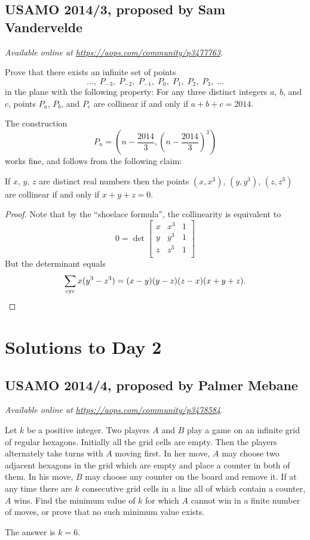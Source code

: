 \documentclass[11pt]{scrartcl}
\begin{document}
\subsection{USAMO 2014/3, proposed by Sam Vandervelde}
\textsl{Available online at \url{https://aops.com/community/p3477763}.}
\begin{mdframed}[style=mdpurplebox,frametitle={Problem statement}]
Prove that there exists an infinite set of points
\[ \dots, \; P_{-3}, \; P_{-2},\; P_{-1},\; P_0,\; P_1,\; P_2,\; P_3,\; \dots \]
in the plane with the following property:
For any three distinct integers $a$, $b$, and $c$,
points $P_a$, $P_b$, and $P_c$ are collinear if and only if $a+b+c=2014$.
\end{mdframed}
The construction
\[ P_n = \left( n-\frac{2014}{3},
  \left( n-\frac{2014}{3} \right)^3 \right) \]
works fine, and follows from the following claim:
\begin{claim*}
  If $x$, $y$, $z$ are distinct real numbers
  then the points $(x,x^3)$, $(y,y^3)$, $(z,z^3)$
  are collinear if and only if $x+y+z=0$.
\end{claim*}
\begin{proof}
  Note that by the ``shoelace formula'',
  the collinearity is equivalent to
  \[
    0 =
    \det \begin{bmatrix}
      x & x^3 & 1 \\
      y & y^3 & 1 \\
      z & z^3 & 1 \\
    \end{bmatrix}
  \]
  But the determinant equals
  \[ \sum_{\text{cyc}} x(y^3-z^3)
    = (x-y)(y-z)(z-x)(x+y+z). \qedhere  \]
\end{proof}
\pagebreak

\section{Solutions to Day 2}
\subsection{USAMO 2014/4, proposed by Palmer Mebane}
\textsl{Available online at \url{https://aops.com/community/p3478584}.}
\begin{mdframed}[style=mdpurplebox,frametitle={Problem statement}]
Let $k$ be a positive integer.
Two players $A$ and $B$ play a game on an infinite grid of regular hexagons.
Initially all the grid cells are empty.
Then the players alternately take turns with $A$ moving first.
In her move, $A$ may choose two adjacent hexagons in the grid
which are empty and place a counter in both of them.
In his move, $B$ may choose any counter on the board and remove it.
If at any time there are $k$ consecutive grid cells
in a line all of which contain a counter, $A$ wins.
Find the minimum value of $k$ for which $A$ cannot
win in a finite number of moves, or prove that no such minimum value exists.
\end{mdframed}
The answer is $k = 6$.
\end{document}
